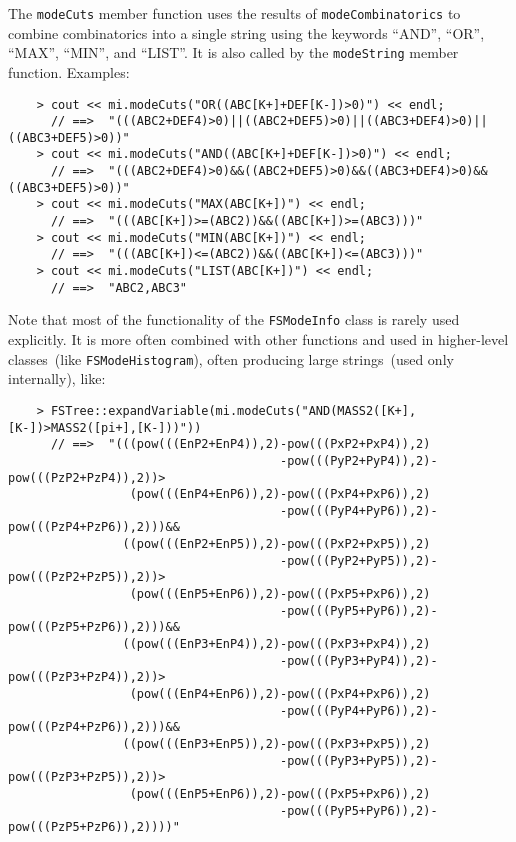 \documentclass[11pt]{article}
\begin{document}
The {\tt modeCuts} member function uses the results of {\tt modeCombinatorics} to combine combinatorics into a single string using the keywords ``AND'', ``OR'', ``MAX'', ``MIN'', and ``LIST''.  It is also called by the {\tt modeString} member function.  Examples:
\begin{verbatim}
    > cout << mi.modeCuts("OR((ABC[K+]+DEF[K-])>0)") << endl;
      // ==>  "(((ABC2+DEF4)>0)||((ABC2+DEF5)>0)||((ABC3+DEF4)>0)||((ABC3+DEF5)>0))"
    > cout << mi.modeCuts("AND((ABC[K+]+DEF[K-])>0)") << endl;
      // ==>  "(((ABC2+DEF4)>0)&&((ABC2+DEF5)>0)&&((ABC3+DEF4)>0)&&((ABC3+DEF5)>0))"
    > cout << mi.modeCuts("MAX(ABC[K+])") << endl;
      // ==>  "(((ABC[K+])>=(ABC2))&&((ABC[K+])>=(ABC3)))"
    > cout << mi.modeCuts("MIN(ABC[K+])") << endl;
      // ==>  "(((ABC[K+])<=(ABC2))&&((ABC[K+])<=(ABC3)))"
    > cout << mi.modeCuts("LIST(ABC[K+])") << endl;
      // ==>  "ABC2,ABC3"
\end{verbatim}

Note that most of the functionality of the {\tt FSModeInfo} class is rarely used explicitly.  It is more often combined with other functions and used in higher-level classes~(like {\tt FSModeHistogram}), often producing large strings~(used only internally), like:
\begin{verbatim}
    > FSTree::expandVariable(mi.modeCuts("AND(MASS2([K+],[K-])>MASS2([pi+],[K-]))"))
      // ==>  "(((pow(((EnP2+EnP4)),2)-pow(((PxP2+PxP4)),2)
                                      -pow(((PyP2+PyP4)),2)-pow(((PzP2+PzP4)),2))>
                 (pow(((EnP4+EnP6)),2)-pow(((PxP4+PxP6)),2)
                                      -pow(((PyP4+PyP6)),2)-pow(((PzP4+PzP6)),2)))&&
                ((pow(((EnP2+EnP5)),2)-pow(((PxP2+PxP5)),2)
                                      -pow(((PyP2+PyP5)),2)-pow(((PzP2+PzP5)),2))>
                 (pow(((EnP5+EnP6)),2)-pow(((PxP5+PxP6)),2)
                                      -pow(((PyP5+PyP6)),2)-pow(((PzP5+PzP6)),2)))&&
                ((pow(((EnP3+EnP4)),2)-pow(((PxP3+PxP4)),2)
                                      -pow(((PyP3+PyP4)),2)-pow(((PzP3+PzP4)),2))>
                 (pow(((EnP4+EnP6)),2)-pow(((PxP4+PxP6)),2)
                                      -pow(((PyP4+PyP6)),2)-pow(((PzP4+PzP6)),2)))&&
                ((pow(((EnP3+EnP5)),2)-pow(((PxP3+PxP5)),2)
                                      -pow(((PyP3+PyP5)),2)-pow(((PzP3+PzP5)),2))>
                 (pow(((EnP5+EnP6)),2)-pow(((PxP5+PxP6)),2)
                                      -pow(((PyP5+PyP6)),2)-pow(((PzP5+PzP6)),2))))"
\end{verbatim} 
\end{document}
